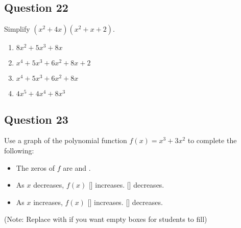 \documentclass[12pt]{article}
\begin{document}
\subsection*{Question 22}
Simplify \( (x^2 + 4x)(x^2 + x + 2) \).
\begin{enumerate}[label=\Alph*.]
    \item \( 8x^2 + 5x^3 + 8x \)
    \item \( x^4 + 5x^3 + 6x^2 + 8x + 2 \)
    \item \( x^4 + 5x^3 + 6x^2 + 8x \)
    \item \( 4x^5 + 4x^4 + 8x^3 \)
\end{enumerate}

\subsection*{Question 23}
Use a graph of the polynomial function \( f(x) = x^3 + 3x^2 \) to complete the following:
\begin{itemize}
    \item The zeros of \(f\) are \framebox[1cm]{\phantom{x}} and \framebox[1cm]{\phantom{x}}.
    \item As \(x\) decreases, \(f(x)\) [\XBox] increases. [\XBox] decreases.
    \item As \(x\) increases, \(f(x)\) [\XBox] increases. [\XBox] decreases.
\end{itemize}
(Note: Replace \XBox with \Square if you want empty boxes for students to fill)

\end{document}
